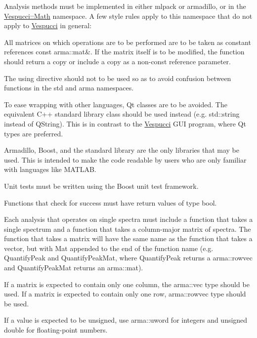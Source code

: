 Analysis methods must be implemented in either mlpack or armadillo, or in the {\ttfamily \hyperlink{namespace_vespucci_1_1_math}{Vespucci\+::\+Math}} namespace. A few style rules apply to this namespace that do not apply to \hyperlink{namespace_vespucci}{Vespucci} in general\+:
\begin{DoxyItemize}
\item All matrices on which operations are to be performed are to be taken as constant references {\ttfamily const arma\+::mat\&}. If the matrix itself is to be modified, the function should return a copy or include a copy as a non-\/{\ttfamily const} reference parameter.
\item The {\ttfamily using} directive should not to be used so as to avoid confusion between functions in the {\ttfamily std} and {\ttfamily arma} namespaces.
\item To ease wrapping with other languages, Qt classes are to be avoided. The equivalent C++ standard library class should be used instead (e.\+g. {\ttfamily std\+::string} instead of {\ttfamily Q\+String}). This is in contrast to the \hyperlink{namespace_vespucci}{Vespucci} G\+UI program, where Qt types are preferred.
\item Armadillo, Boost, and the standard library are the only libraries that may be used. This is intended to make the code readable by users who are only familiar with languages like M\+A\+T\+L\+AB.
\item Unit tests must be written using the Boost unit test framework.
\item Functions that check for success must have return values of type {\ttfamily bool}.
\item Each analysis that operates on single spectra must include a function that takes a single spectrum and a function that takes a column-\/major matrix of spectra. The function that takes a matrix will have the same name as the function that takes a vector, but with {\ttfamily Mat} appended to the end of the function name (e.\+g. {\ttfamily Quantify\+Peak} and {\ttfamily Quantify\+Peak\+Mat}, where {\ttfamily Quantify\+Peak} returns a {\ttfamily arma\+::rowvec} and {\ttfamily Quantify\+Peak\+Mat} returns an {\ttfamily arma\+::mat}).
\item If a matrix is expected to contain only one column, the {\ttfamily arma\+::vec} type should be used. If a matrix is expected to contain only one row, {\ttfamily arma\+::rowvec} type should be used.
\item If a value is expected to be unsigned, use {\ttfamily arma\+::uword} for integers and {\ttfamily unsigned double} for floating-\/point numbers.

\end{DoxyItemize}
